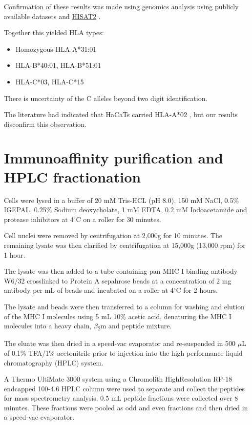 \documentclass[12pt,]{book}
\providecommand{\tightlist}{%
  \setlength{\itemsep}{0pt}\setlength{\parskip}{0pt}}
\begin{document}
Confirmation of these results was made using genomics analysis using
publicly available datasets and
\href{https://ccb.jhu.edu/software/hisat2/index.shtml}{HISAT2}
\citep{kim2015}.

Together this yielded HLA types:

\begin{itemize}
\tightlist
\item
  Homozygous HLA-A*31:01
\item
  HLA-B*40:01, HLA-B*51:01
\item
  HLA-C*03, HLA-C*15
\end{itemize}

There is uncertainty of the C alleles beyond two digit identification.

The literature had indicated that HaCaTs carried HLA-A*02
\citep{lemaitre2004}, but our results disconfirm this observation.

\section{Immunoaffinity purification and HPLC
fractionation}\label{immunoaffinity-purification-and-hplc-fractionation}

Cells were lysed in a buffer of 20 mM Tris-HCL (pH 8.0), 150 mM NaCl,
0.5\% IGEPAL, 0.25\% Sodium deoxycholate, 1 mM EDTA, 0.2 mM
Iodoacetamide and protease inhibitors at 4\(^\circ\)C on a roller for 30
minutes.

Cell nuclei were removed by centrifugation at 2,000g for 10 minutes. The
remaining lysate was then clarified by centrifugation at 15,000g (13,000
rpm) for 1 hour.

The lysate was then added to a tube containing pan-MHC I binding
antibody W6/32 crosslinked to Protein A sepahrose beads at a
concentration of 2 mg antibody per mL of beads and incubated on a roller
at 4\(^\circ\)C for 2 hours.

The lysate and beads were then transferred to a column for washing and
elution of the MHC I molecules using 5 mL 10\% acetic acid, denaturing
the MHC I molecules into a heavy chain, \(\beta\)\textsubscript{2}m and
peptide mixture.

The eluate was then dried in a speed-vac evaporator and re-suspended in
500 \(\mu\)L of 0.1\% TFA/1\% acetonitrile prior to injection into the
high performance liquid chromatography (HPLC) system.

A Thermo UltiMate 3000 system using a Chromolith HighResolution RP-18
endcapped 100-4.6 HPLC column were used to separate and collect the
peptides for mass spectrometry analysis. 0.5 mL peptide fractions were
collected over 8 minutes. These fractions were pooled as odd and even
fractions and then dried in a speed-vac evaporator.
\end{document}
